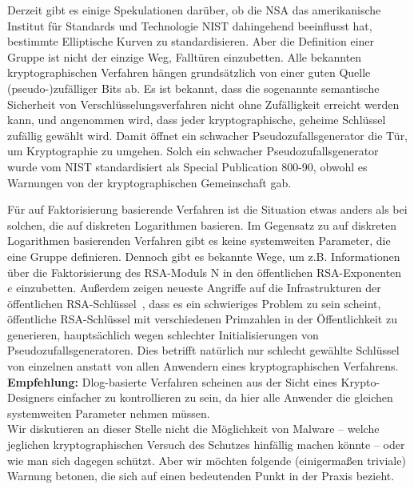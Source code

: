 \begin{refsegment}
Derzeit gibt es einige Spekulationen darüber, ob die NSA das amerikanische Institut für Standards und Technologie NIST dahingehend beeinflusst hat, bestimmte Elliptische Kurven zu standardisieren. Aber die Definition einer Gruppe ist nicht der einzige Weg, Falltüren einzubetten. Alle bekannten kryptographischen Verfahren hängen grundsätzlich von einer guten Quelle (pseudo-)zu\-fälliger Bits ab. Es ist bekannt, dass die sogenannte semantische Sicherheit von Verschlüsselungsverfahren nicht ohne Zufälligkeit erreicht werden kann, und angenommen wird, dass jeder kryptographische, geheime Schlüssel zufällig gewählt wird. Damit öffnet ein schwacher Pseudozufallsgenerator die Tür, um Kryptographie zu umgehen. Solch ein schwacher Pseudozufallsgenerator wurde vom NIST standardisiert als Special Publication 800-90, obwohl es Warnungen von der kryptographischen Gemeinschaft gab.

Für auf Faktorisierung basierende Verfahren ist die Situation etwas anders als bei solchen, die auf diskreten Logarithmen basieren. Im Gegensatz zu auf diskreten Logarithmen basierenden Verfahren gibt es keine systemweiten Parameter, die eine Gruppe definieren. Dennoch gibt es bekannte Wege, um z.B. Informationen über die Faktorisierung des RSA-Moduls N in den öffentlichen RSA-Exponenten $e$ einzubetten. Außerdem zeigen neueste Angriffe auf die Infrastrukturen der öffentlichen RSA-Schlüssel~\cite{keys2012, Heninger2012}, dass es ein schwieriges Problem zu sein scheint, öffentliche RSA-Schlüssel mit verschiedenen Primzahlen in der Öffentlichkeit zu generieren, hauptsächlich wegen schlechter Initialisierungen von Pseudozufallsgeneratoren. Dies betrifft natürlich nur schlecht gewählte Schlüssel von einzelnen anstatt von allen Anwendern eines kryptographischen Verfahrens.\\[0.1cm]


\noindent \textbf{Empfehlung:} Dlog-basierte Verfahren scheinen aus der Sicht eines Krypto-Designers einfacher zu kontrollieren zu sein, da hier alle Anwender die gleichen systemweiten Parameter nehmen müssen.\\[0.1cm]


Wir diskutieren an dieser Stelle nicht die Möglichkeit von Malware -- welche jeglichen kryptographischen Versuch des Schutzes hinfällig machen könnte -- oder wie man sich dagegen schützt. Aber wir möchten folgende (einigermaßen triviale) Warnung betonen, die sich auf einen bedeutenden Punkt in der Praxis bezieht.\\[0.1cm]


\end{refsegment}
